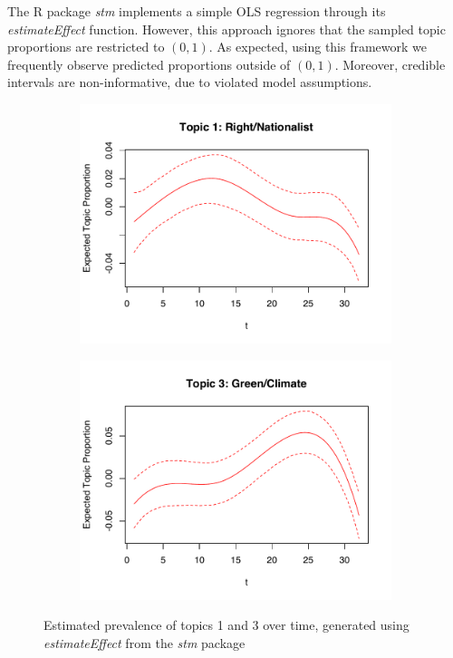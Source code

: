 The R package \textit{stm} implements a simple OLS regression through its \textit{estimateEffect} function. However, this approach ignores that the sampled topic proportions are restricted to $(0,1)$. As expected, using this framework we frequently observe predicted proportions outside of $(0,1)$. Moreover, credible intervals are non-informative, due to violated model assumptions. 

\begin{figure}[h!]
  \centering
  \captionsetup{justification=centering,margin=2cm}
  \begin{subfigure}[b]{0.4\linewidth}
    \includegraphics[width=\linewidth]{../plots/4_4/estEffect_topic1.pdf}
  \end{subfigure}
  \begin{subfigure}[b]{0.4\linewidth}
    \includegraphics[width=\linewidth]{../plots/4_4/estEffect_topic3.pdf}
  \end{subfigure}
  \caption{Estimated prevalence of topics 1 and 3 over time, generated using \textit{estimateEffect} from the \textit{stm} package}
  \label{fig:coffee}
\end{figure}

